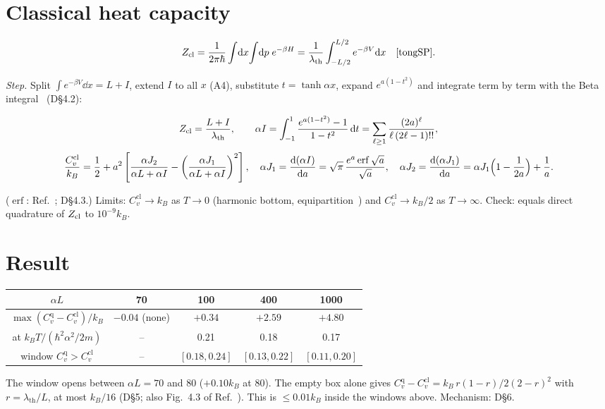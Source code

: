 \documentclass[10pt]{article}
\providecommand{\erf}{\operatorname{erf}}
\newcommand{\lth}{\lambda_{\mathrm{th}}}
\newcommand{\Cq}{C_v^{\mathrm{q}}}
\newcommand{\Ccl}{C_v^{\mathrm{cl}}}
\newcommand{\kB}{k_{B}}
\newcommand{\D}[1]{\textsf{D\S#1}}
\newcommand{\step}[1]{\par\smallskip\textit{#1}\;}
\begin{document}
\section{Classical heat capacity}
\begin{equation}
Z_{\rm cl}=\frac{1}{2\pi\hbar}\int\!\dd x\!\int\!\dd p\;e^{-\beta H}=\frac{1}{\lth}\int_{-L/2}^{L/2}e^{-\beta V}\dd x\quad\text{\cite[p.~32, Eq.~(2.1); p.~35, Eq.~(2.6)]{tongSP}}.
\end{equation}
\step{Step.} Split $\int e^{-\beta V}\dd x=L+I$, extend $I$ to all $x$ (A4), substitute $t=\tanh\alpha x$, expand $e^{a(1-t^2)}$ and integrate term by term with the Beta integral~\cite[Eq.~(5.12.1)]{dlmf} (\D{4.2}):
\begin{keybox}
\vspace{-3mm}
\begin{equation}
Z_{\rm cl}=\frac{L+I}{\lth},\qquad \alpha I=\int_{-1}^{1}\frac{e^{a(1-t^2)}-1}{1-t^2}\,\dd t=\sum_{\ell\ge1}\frac{(2a)^\ell}{\ell\,(2\ell-1)!!},
\end{equation}
\begin{equation}
\frac{\Ccl}{\kB}=\frac12+a^2\left[\frac{\alpha J_2}{\alpha L+\alpha I}-\left(\frac{\alpha J_1}{\alpha L+\alpha I}\right)^2\right],\quad
\alpha J_1=\dv{(\alpha I)}{a}=\sqrt\pi\,\frac{e^{a}\erf\sqrt a}{\sqrt a},\quad \alpha J_2=\dv{(\alpha J_1)}{a}=\alpha J_1\Big(1-\frac{1}{2a}\Big)+\frac1a .
\label{eq:Ccl}
\end{equation}
\end{keybox}
($\erf$: Ref.~\cite[Eq.~(7.2.1)]{dlmf}; \D{4.3}.) Limits: $\Ccl\to\kB$ as $T\to0$ (harmonic bottom, equipartition~\cite[p.~95]{LGK}) and $\Ccl\to\kB/2$ as $T\to\infty$. Check: equals direct quadrature of $Z_{\rm cl}$ to $10^{-9}\kB$.

\section{Result}
\begin{center}\small
\begin{tabular}{ccccc}
\toprule
$\alpha L$ & 70 & 100 & 400 & 1000\\
\midrule
$\max(\Cq-\Ccl)/\kB$ & $-0.04$ (none) & $+0.34$ & $+2.59$ & $+4.80$\\
at $\kB T/(\hbar^2\alpha^2/2m)$ & -- & 0.21 & 0.18 & 0.17\\
window $\Cq>\Ccl$ & -- & $[0.18,0.24]$ & $[0.13,0.22]$ & $[0.11,0.20]$\\
\bottomrule
\end{tabular}
\end{center}
The window opens between $\alpha L=70$ and $80$ ($+0.10\kB$ at 80). The empty box alone gives $\Cq-\Ccl=\kB\,r(1-r)/2(2-r)^2$ with $r=\lth/L$, at most $\kB/16$ (\D{5}; also Fig.~4.3 of Ref.~\cite[p.~95]{LGK}). This is $\le0.01\kB$ inside the windows above. Mechanism: \D{6}.
\end{document}

